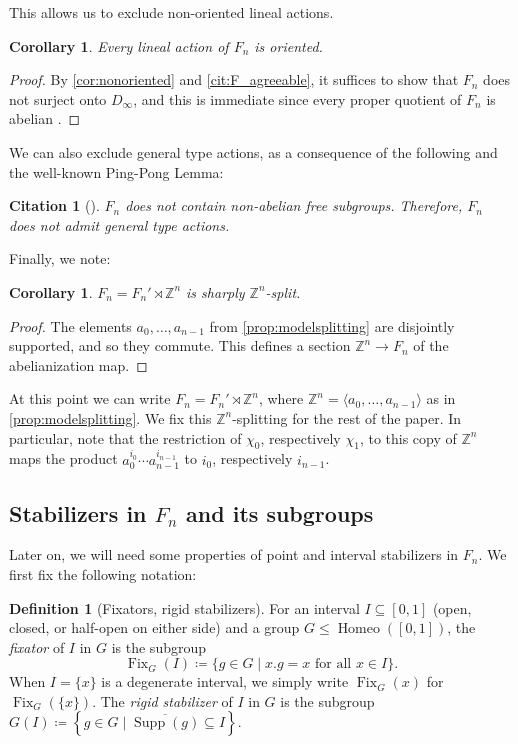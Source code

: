 \documentclass[reqno,12pt]{amsart}\setcounter{tocdepth}{1}
\newtheorem{corollary}[theorem]{Corollary}
\newtheorem{cit}[theorem]{Citation}
\theoremstyle{definition}
\newtheorem{definition}[theorem]{Definition}
\newcommand{\Z}{\mathbb{Z}}
\DeclareMathOperator{\Homeo}{Homeo}
\DeclareMathOperator{\Supp}{Supp}
\DeclareMathOperator{\Fix}{Fix}
\numberwithin{equation}{section}
\begin{document}
This allows us to exclude non-oriented lineal actions.

\begin{corollary}\label{cor:nonoriented:f}
Every lineal action of $F_n$ is oriented.
\end{corollary}

\begin{proof}
By \cref{cor:nonoriented} and \cref{cit:F_agreeable}, it suffices to show that $F_n$ does not surject onto $D_\infty$, and this is immediate since every proper quotient of $F_n$ is abelian \cite[Theorem~4.13]{brown87}.
\end{proof}

We can also exclude general type actions, as a consequence of the following and the well-known Ping-Pong Lemma:

\begin{cit}[\cite{brin85}]
\label{cit:nofree}
    $F_n$ does not contain non-abelian free subgroups. Therefore, $F_n$ does not admit general type actions.
\end{cit}

Finally, we note:

\begin{corollary}
\label{cor:Fsplit}
$F_n = F_n' \rtimes \Z^n$ is sharply $\Z^n$-split.
\end{corollary}

\begin{proof}
The elements $a_0, \ldots, a_{n-1}$ from \cref{prop:modelsplitting} are disjointly supported, and so they commute. This defines a section $\Z^n \to F_n$ of the abelianization map.
\end{proof}

At this point we can write $F_n = F_n' \rtimes \Z^n$, where $\Z^n = \langle a_0, \ldots, a_{n-1} \rangle$ as in \cref{prop:modelsplitting}. We fix this $\Z^n$-splitting for the rest of the paper. In particular, note that the restriction of $\chi_0$, respectively $\chi_1$, to this copy of $\Z^n$ maps the product $a_0^{i_0}\cdots a_{n-1}^{i_{n-1}}$ to $i_0$, respectively $i_{n-1}$.


\subsection{Stabilizers in $F_n$ and its subgroups}

Later on, we will need some properties of point and interval stabilizers in $F_n$. We first fix the following notation:

\begin{definition}[Fixators, rigid stabilizers]
For an interval $I \subseteq [0, 1]$ (open, closed, or half-open on either side) and a group $G \leq \Homeo([0, 1])$, the \emph{fixator} of $I$ in $G$ is the subgroup
\[
\Fix_G(I) \coloneqq \{ g \in G \mid x.g = x \text{ for all } x \in I \}.
\]
When $I = \{ x \}$ is a degenerate interval, we simply write $\Fix_G(x)$ for $\Fix_G(\{x\})$. The \emph{rigid stabilizer} of $I$ in $G$ is the subgroup $G(I) \coloneqq \left\{ g \in G \mid \overline{\Supp(g)} \subseteq I \right\}$.
\end{definition}
\end{document}
